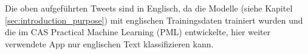 Die oben aufgef{\"u}hrten Tweets sind in Englisch, da die Modelle (siehe Kapitel \ref{sec:introduction_purpose}) mit englischen Trainingsdaten trainiert wurden und die im CAS Practical Machine Learning (PML) entwickelte, hier weiter verwendete App nur englischen Text klassifizieren kann.                                                                                                                                                                                                                                                                                                                                                                                                                                                                                                                                                                                                                                                                                                                                                                                                                                                                                                                                                                                                                                                                                                                                                                                                                                                                                                                                                                                                                                                                                                                                                                                                                                                                                                                                                                                                                                                                                                                                                                                                                                                                                                                                                                                                                                                                                                                                                                                                                                                                                                                                                                                                                                                                                                                                                                                                                                                                                                                                                                                                                                                                                                                                                                        
